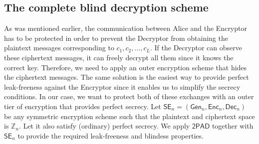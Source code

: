 \documentclass[10pt,journal]{IEEEtran}
\newcommand{\Z}{\mathbb{Z}}
\newcommand{\alg}[1]{\mathsf{#1}}
\newcommand{\sch}[1]{\mathsf{#1}}
\begin{document}
\subsection{The complete blind decryption scheme}

As was mentioned earlier, the communication between Alice and the Encryptor has to be protected 
in order to prevent
the Decryptor from obtaining
the plaintext messages corresponding to $c_1,c_2,\ldots,c_L$. If the Decryptor can observe these ciphertext messages,
it can freely decrypt all them since it knows the correct key. Therefore,
we need to apply an outer encryption scheme that hides the ciphertext messages.
The same solution is
the easiest way to provide perfect leak-freeness against the Encryptor
since it enables us to simplify
the secrecy conditions.
In our case, we want to protect both of these exchanges
with an outer tier of encryption that provides perfect secrecy.
Let $\sch{SE}_n = (\alg{Gen}_n,\alg{Enc}_n,\alg{Dec}_n)$ be any symmetric encryption scheme
such that the plaintext and ciphertext space is $\Z_n$.
Let it also satisfy (ordinary) perfect secrecy.
We apply $\sch{2PAD}$ together
with $\sch{SE}_n$ to provide the required leak-freeness and blindess properties.
\end{document}

